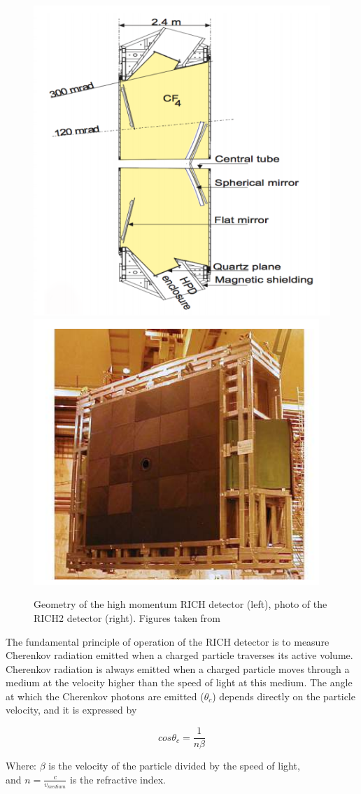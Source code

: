 \begin{figure}[h]
 \begin{center}
  \includegraphics[width=0.49\linewidth]{figures/RICH2.PNG}
   \includegraphics[width=0.49\linewidth]{figures/RICH2_photo.PNG}
    \caption{Geometry of the high momentum RICH detector (left), photo of the RICH2 detector (right). Figures taken from~\cite{lhcb}}%
    \label{fig:RICH2}%
 \end{center}
\end{figure}

The fundamental principle of operation of the RICH detector is to measure Cherenkov radiation emitted when a charged particle traverses its active volume. Cherenkov radiation is always emitted when a charged particle moves through a medium at the velocity higher than the speed of light at this medium. The angle at which the Cherenkov photons are emitted ($\theta_c$) depends directly on the particle velocity, and it is expressed by

\begin{equation}
cos \theta_c = \frac{1}{n\beta}
\end{equation}

Where: $\beta$ is the velocity of the particle divided by the speed of light,\\ and $n = \frac{c}{v_{medium}}$
is the refractive index. 

